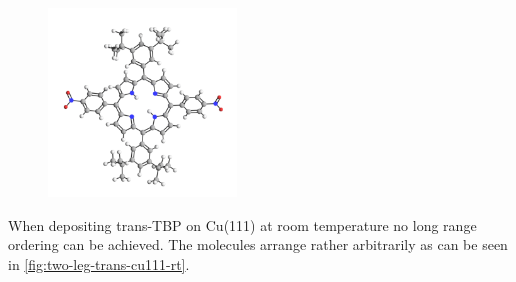 \begin{figure}\centering
	\includegraphics[angle=90, width=5cm]{./images/molecules/max-zoom/TBP-trans-600}
	\caption{}
\end{figure}

When depositing trans-TBP on Cu(111) at room temperature no long range ordering can be achieved. The molecules arrange rather arbitrarily as can be seen in  \autoref{fig:two-leg-trans-cu111-rt}.

